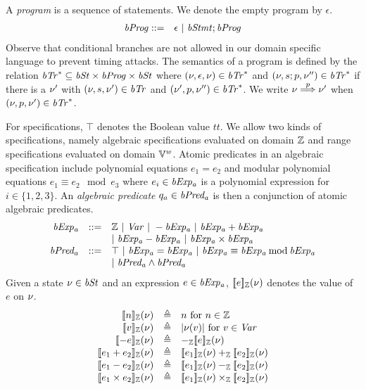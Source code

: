A \emph{program} is a sequence of statements.
We denote the empty program by $\epsilon$.
\begin{eqnarray*}
  \mathit{bProg} & ::= & \epsilon \ |\ \mathit{bStmt}; \mathit{bProg}
\end{eqnarray*}
Observe that conditional branches are not allowed in our domain specific language to prevent timing attacks.
The semantics of a program is defined by the relation $\mathit{bTr}^* \subseteq \mathit{bSt} \times \mathit{bProg} \times \mathit{bSt}$ where $(\nu, \epsilon, \nu) \in \mathit{bTr}^*$ and $(\nu, s; p, \nu'') \in \mathit{bTr}^*$ if there is a $\nu'$ with $(\nu, s, \nu') \in \mathit{bTr}$ and $(\nu', p, \nu'') \in \mathit{bTr}^*$.
We write $\nu \overset{p}{\Longrightarrow} \nu'$ when $(\nu, p, \nu') \in \mathit{bTr}^*$.

For specifications, $\top$ denotes the Boolean value $\mathit{tt}$.
We allow two kinds of specifications, namely algebraic specifications evaluated on domain $\mathbb{Z}$ and range specifications evaluated on domain $\mathbb{V}^{\mathit{w}}$.
Atomic predicates in an algebraic specification include polynomial equations $e_1 = e_2$ and modular polynomial equations $e_1 \equiv e_2 \mod e_3$ where $e_i \in \mathit{bExp_a}$ is a polynomial expression for $i \in \{1, 2, 3\}$.
An \emph{algebraic predicate} $q_a \in \mathit{bPred_a}$ is then a conjunction of atomic algebraic predicates.
\[
\begin{array}{rcl}
  \mathit{bExp_a} & ::= & \mathbb{Z} \ |\ \mathit{Var} \ |\ - \mathit{bExp_a} \ |\ \mathit{bExp_a} + \mathit{bExp_a} \\
          &     & |\ \mathit{bExp_a} - \mathit{bExp_a} \ |\ \mathit{bExp_a} \times \mathit{bExp_a} \\
  \mathit{bPred_a} & ::= & \top \ |\ \mathit{bExp_a} = \mathit{bExp_a}\ |\ \mathit{bExp_a} \equiv \mathit{bExp_a} \mathbin{\textmd{mod}} \mathit{bExp_a} \\
           &     & |\ \mathit{bPred_a} \wedge \mathit{bPred_a} \\
\end{array}
\]
Given a state $\nu \in \mathit{bSt}$ and an expression $e \in \mathit{bExp_a}$, $[\![{e}]\!]_{\mathbb{Z}}(\nu)$ denotes the value of $e$ on $\nu$.
\[
\begin{array}{rcl}
  \zvalueof{n}(\bvst) & \defn & n \textmd{ for $n \in \bbfZ$} \\
  \zvalueof{v}(\bvst) & \defn & \unsigned{\bvst(v)} \textmd{ for $v \in \Var$} \\
  \zvalueof{- e}(\bvst) & \defn & -_\bbfZ \zvalueof{e}(\bvst) \\
  \zvalueof{e_1 + e_2}(\bvst) & \defn & \zvalueof{e_1}(\bvst) +_\bbfZ \zvalueof{e_2}(\bvst) \\
  \zvalueof{e_1 - e_2}(\bvst) & \defn & \zvalueof{e_1}(\bvst) -_\bbfZ \zvalueof{e_2}(\bvst) \\
  \zvalueof{e_1 \times e_2}(\bvst) & \defn & \zvalueof{e_1}(\bvst) \times_\bbfZ \zvalueof{e_2}(\bvst) \\
\end{array}
\]
